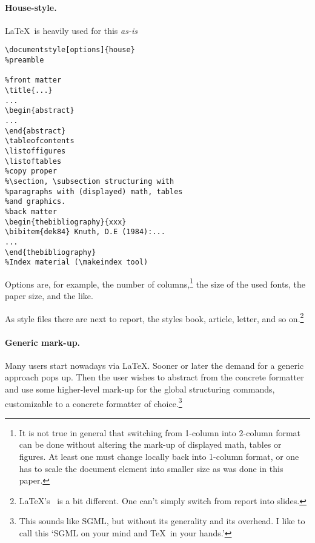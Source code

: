 \paragraph*{House-style.}
\LaTeX\  is heavily used for this {\em as-is}
\begingroup\small\begin{verbatim}
\documentstyle[options]{house}
%preamble

%front matter
\title{...}
...
\begin{abstract}
...
\end{abstract}
\tableofcontents
\listoffigures
\listoftables
%copy proper
%\section, \subsection structuring with
%paragraphs with (displayed) math, tables
%and graphics.
%back matter
\begin{thebibliography}{xxx}
\bibitem{dek84} Knuth, D.E (1984):...
...
\end{thebibliography}
%Index material (\makeindex tool)

\end{verbatim}\endgroup
Options are, for example,
the number of columns,\footnote{It is not true in general that switching from
   1-column into 2-column format can be done without altering the mark-up
   of displayed math, tables or figures.
   At least one must change locally back into
   1-column format, or one has to scale the document element into smaller
   size as was done in this paper.}
the size of the used fonts,
the paper size, and the like.

As style files there are next to report,
the styles book, article, letter, and so on.\footnote{\LaTeX's \SliTeX\
is a bit different. One can't simply switch from report into slides.}


\paragraph*{Generic mark-up.}
Many users start nowadays via \LaTeX. Sooner or later the demand for
a generic approach pops up.
Then the user wishes to
abstract from the concrete formatter and
use some higher-level mark-up for the global structuring commands, customizable
to a concrete formatter of choice.\footnote{This sounds like SGML, but without
   its generality and its overhead. I like to call this `SGML on your mind
   and \TeX\ in your hands.'}

